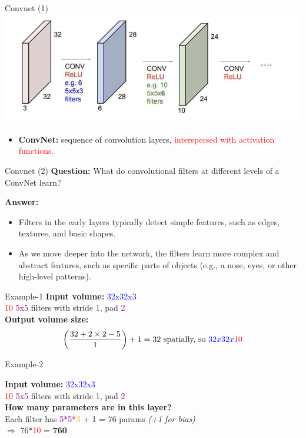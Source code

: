 \documentclass[default, aspectratio=169]{beamer}
\begin{document}
	\begin{frame}{Convnet (1)}
		\centering
		\includegraphics[keepaspectratio, scale=0.7]{pic/convnet.png}
		\smallskip
		\begin{itemize}
			\item \textbf {ConvNet:} sequence of convolution layers, \textcolor{red}{interspersed with activation functions.}
		\end{itemize}
	\end{frame}
	\begin{frame}{Convnet (2)}
		\textbf{Question:}
		What do convolutional filters at different levels of a ConvNet learn?
		
		\bigskip
		
		\textbf{Answer:} 
		\begin{itemize}
			\item Filters in the early layers typically detect simple features, such as edges, textures, and basic shapes.
			\item As we move deeper into the network, the filters learn more complex and abstract features, such as specific parts of objects (e.g., a nose, eyes, or other high-level patterns).
		\end{itemize}
	\end{frame}
	\begin{frame}{Example-1}
		\textbf{Input volume:} \textcolor{blue}{32x32x3}\\
		\textcolor{red}{10} \textcolor{purple}{5x5} filters with stride \textcolor{deepgreen}{1}, pad \textcolor{purple}{2}\\[10pt]
		
		\textbf{Output volume size:}\\
		\[
		\left(\frac{32 + 2 \times 2 - 5}{1}\right) + 1 = 32 \text{ spatially, so} \ \textcolor{blue}{32x32x}\textcolor{red}{10}
		\]
	\end{frame}
	\begin{frame}{Example-2}
		
		\textbf{Input volume:} \textcolor{blue}{32x32x3}\\
		\textcolor{red}{10} \textcolor{purple}{5x5} filters with stride \textcolor{deepgreen}{1}, pad \textcolor{purple}{2}\\[10pt]
		
		\textbf{How many parameters are in this layer?}\\
		Each filter has \textcolor{purple}{5*5}*\textcolor{orange}{3} + 1 = \textcolor{deepgreen}{76} params \hspace{5pt} \textit{(+1 for bias)}\\
		$\Rightarrow$ \textcolor{deepgreen}{76}*\textcolor{red}{10} = \textbf{760}
	\end{frame}
\end{document}
